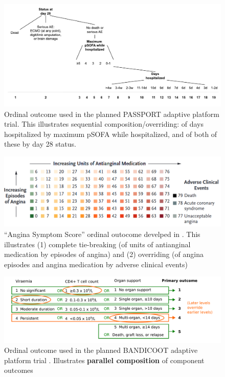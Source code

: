 \documentclass[
  11pt,
  fleqn
]{article}
\begin{document}
\begin{figure}
  \includegraphics[width=7in]{passport_ordinal_outcome_sequential.pdf}
  \caption{Ordinal outcome used in the planned PASSPORT adaptive
    platform trial. This illustrates sequential composition/overriding:
    of days hospitalized by maximum pSOFA while hospitalized, and of
  both of these by day 28 status.}
  \label{fig:passport_outcome}
\end{figure}

\begin{figure}
  \includegraphics[width=6in]{rajkumar_et_al_outcome.png}
  \caption{``Angina Symptom Score'' ordinal outocome develped in
    \citep{rajkumarPlaceboControlledTrialPercutaneous2023}. This illustrates
    (1) complete tie-breaking (of units of antianginal medication by
    episodes of angina) and (2) overriding (of angina episodes and
  angina medication by adverse clinical events)}
  \label{fig:rajkumar_et_al_outcome}
\end{figure}

\begin{figure}
  \includegraphics[width=7in]{parallel_composition_bandicoot.pdf}
  \caption{Ordinal outcome used in the planned BANDICOOT adaptive
    platform trial \citep{walkerCodesigningNovelOrdinal2025}.
  Illustrates \textbf{parallel composition} of component outcomes}
  \label{fig:parallel_bandicoot}
\end{figure}
\end{document}
